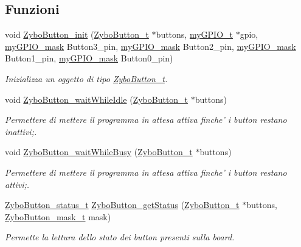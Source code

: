 \subsection*{Funzioni}
\begin{DoxyCompactItemize}
\item 
void \hyperlink{group___button_gac5362bbb2d8845e2403e9cbe18cf3834}{Zybo\+Button\+\_\+init} (\hyperlink{struct_zybo_button__t}{Zybo\+Button\+\_\+t} $\ast$buttons, \hyperlink{structmy_g_p_i_o__t}{my\+G\+P\+I\+O\+\_\+t} $\ast$gpio, \hyperlink{group__my_g_p_i_o_ga402a0d20afc0cb7c25554b8b023f4253}{my\+G\+P\+I\+O\+\_\+mask} Button3\+\_\+pin, \hyperlink{group__my_g_p_i_o_ga402a0d20afc0cb7c25554b8b023f4253}{my\+G\+P\+I\+O\+\_\+mask} Button2\+\_\+pin, \hyperlink{group__my_g_p_i_o_ga402a0d20afc0cb7c25554b8b023f4253}{my\+G\+P\+I\+O\+\_\+mask} Button1\+\_\+pin, \hyperlink{group__my_g_p_i_o_ga402a0d20afc0cb7c25554b8b023f4253}{my\+G\+P\+I\+O\+\_\+mask} Button0\+\_\+pin)
\begin{DoxyCompactList}\small\item\em Inizializza un oggetto di tipo \hyperlink{struct_zybo_button__t}{Zybo\+Button\+\_\+t}. \end{DoxyCompactList}\item 
void \hyperlink{group___button_gaca30e81084e746785e395f79e9678e9a}{Zybo\+Button\+\_\+wait\+While\+Idle} (\hyperlink{struct_zybo_button__t}{Zybo\+Button\+\_\+t} $\ast$buttons)
\begin{DoxyCompactList}\small\item\em Permettere di mettere il programma in attesa attiva finche' i button restano inattivi;. \end{DoxyCompactList}\item 
void \hyperlink{group___button_ga3840edf011b5bad6302b7efc9c6326fe}{Zybo\+Button\+\_\+wait\+While\+Busy} (\hyperlink{struct_zybo_button__t}{Zybo\+Button\+\_\+t} $\ast$buttons)
\begin{DoxyCompactList}\small\item\em Permettere di mettere il programma in attesa attiva finche' i button restano attivi;. \end{DoxyCompactList}\item 
\hyperlink{group___button_ga85c290bfa232cab213e69200bf78e06a}{Zybo\+Button\+\_\+status\+\_\+t} \hyperlink{group___button_ga75407539e8ba0ad3ea142496219cd083}{Zybo\+Button\+\_\+get\+Status} (\hyperlink{struct_zybo_button__t}{Zybo\+Button\+\_\+t} $\ast$buttons, \hyperlink{group___button_ga4d26a5f6cad606de534ba034e0ba42dd}{Zybo\+Button\+\_\+mask\+\_\+t} mask)
\begin{DoxyCompactList}\small\item\em Permette la lettura dello stato dei button presenti sulla board. \end{DoxyCompactList}\end{DoxyCompactItemize}


